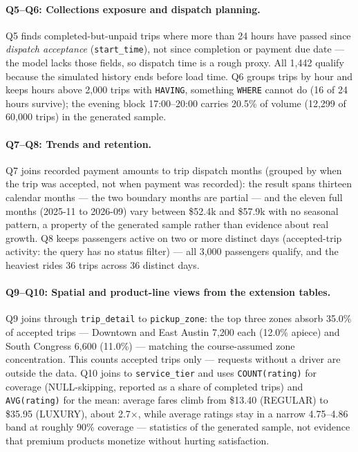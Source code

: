 \paragraph{Q5--Q6: Collections exposure and dispatch planning.}
Q5 finds completed-but-unpaid trips where more than 24 hours have passed since \emph{dispatch acceptance} (\texttt{start\_time}), not since completion or payment due date --- the model lacks those fields, so dispatch time is a rough proxy. All 1{,}442 qualify because the simulated history ends before load time. Q6 groups trips by hour and keeps hours above 2{,}000 trips with \texttt{HAVING}, something \texttt{WHERE} cannot do (16 of 24 hours survive); the evening block 17:00--20:00 carries 20.5\% of volume (12{,}299 of 60{,}000 trips) in the generated sample.

\paragraph{Q7--Q8: Trends and retention.}
Q7 joins recorded payment amounts to trip dispatch months (grouped by when the trip was accepted, not when payment was recorded): the result spans thirteen calendar months --- the two boundary months are partial --- and the eleven full months (2025-11 to 2026-09) vary between \$52.4k and \$57.9k with no seasonal pattern, a property of the generated sample rather than evidence about real growth. Q8 keeps passengers active on two or more distinct days (accepted-trip activity: the query has no status filter) --- all 3{,}000 passengers qualify, and the heaviest rides 36 trips across 36 distinct days.

\paragraph{Q9--Q10: Spatial and product-line views from the extension tables.}
Q9 joins through \texttt{trip\_detail} to \texttt{pickup\_zone}: the top three zones absorb 35.0\% of accepted trips --- Downtown and East Austin 7{,}200 each (12.0\% apiece) and South Congress 6{,}600 (11.0\%) --- matching the course-assumed zone concentration. This counts accepted trips only --- requests without a driver are outside the data. Q10 joins to \texttt{service\_tier} and uses \texttt{COUNT(rating)} for coverage (NULL-skipping, reported as a share of completed trips) and \texttt{AVG(rating)} for the mean: average fares climb from \$13.40 (REGULAR) to \$35.95 (LUXURY), about 2.7$\times$, while average ratings stay in a narrow 4.75--4.86 band at roughly 90\% coverage --- statistics of the generated sample, not evidence that premium products monetize without hurting satisfaction.

